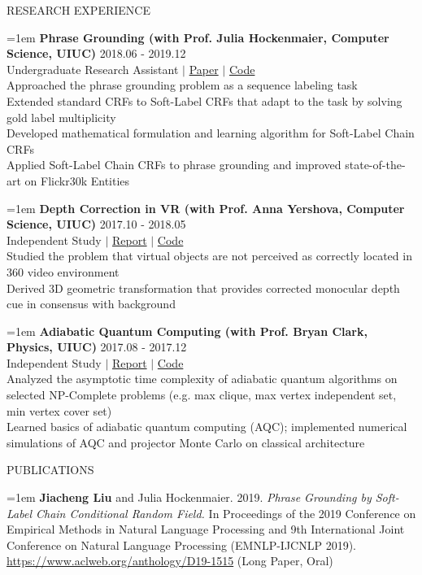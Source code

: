 \documentclass[10pt]{article}
\begin{document}
\vspace{1em}
{\LARGE RESEARCH EXPERIENCE}

\hangindent=1em
\textbf{Phrase Grounding (with Prof. Julia Hockenmaier, Computer Science, UIUC)} \hfill 2018.06 - 2019.12 \\
Undergraduate Research Assistant $|$ \href{https://arxiv.org/abs/1909.00301}{Paper} $|$ \href{https://github.com/liujch1998/SoftLabelCCRF}{Code} \\
Approached the phrase grounding problem as a sequence labeling task \\
Extended standard CRFs to Soft-Label CRFs that adapt to the task by solving gold label multiplicity \\
Developed mathematical formulation and learning algorithm for Soft-Label Chain CRFs \\
Applied Soft-Label Chain CRFs to phrase grounding and improved state-of-the-art on Flickr30k Entities

\hangindent=1em
\textbf{Depth Correction in VR (with Prof. Anna Yershova, Computer Science, UIUC)} \hfill 2017.10 - 2018.05 \\
Independent Study $|$ \href{https://github.com/liujch1998/Lab/blob/master/vr-360-depth-correction/report/report.pdf}{Report} $|$ \href{https://github.com/liujch1998/Lab/tree/master/vr-360-depth-correction}{Code} \\
Studied the problem that virtual objects are not perceived as correctly located in 360 video environment \\
Derived 3D geometric transformation that provides corrected monocular depth cue in consensus with background

\hangindent=1em
\textbf{Adiabatic Quantum Computing (with Prof. Bryan Clark, Physics, UIUC)} \hfill 2017.08 - 2017.12 \\
Independent Study $|$ \href{https://github.com/liujch1998/AQC/blob/master/report/report.pdf}{Report} $|$ \href{https://github.com/liujch1998/AQC}{Code} \\
Analyzed the asymptotic time complexity of adiabatic quantum algorithms on selected NP-Complete problems (e.g. max clique, max vertex independent set, min vertex cover set) \\
Learned basics of adiabatic quantum computing (AQC); implemented numerical simulations of AQC and projector Monte Carlo on classical architecture

\vspace{1em}
{\LARGE PUBLICATIONS}

\hangindent=1em
\textbf{Jiacheng Liu} and Julia Hockenmaier. 2019. \emph{Phrase Grounding by Soft-Label Chain Conditional Random Field.} In Proceedings of the 2019 Conference on Empirical Methods in Natural Language Processing and 9th International Joint Conference on Natural Language Processing (EMNLP-IJCNLP 2019). \href{https://www.aclweb.org/anthology/D19-1515}{https://www.aclweb.org/anthology/D19-1515} (Long Paper, Oral)
\end{document}
